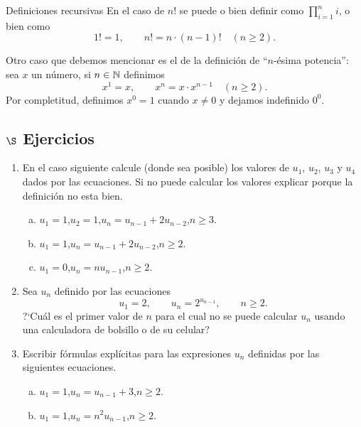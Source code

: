 \begin{section}{Definiciones recursivas}
En  el caso de $n!$ se puede  o bien definir como $\prod_{i=1}^{n} i$, o bien como
$$
1!=1,\qquad n!=n \cdot (n-1)! \quad (n\ge 2).
$$

Otro caso que debemos mencionar es  el de la definición de ``$n$-ésima potencia'': sea $x$ un  número, si $n \in {\mathbb N}$ definimos
$$
x^1=x,\qquad x^n= x \cdot x^{n-1} \quad (n\ge 2).
$$
Por completitud,  definimos $x^0=1$ cuando $x \ne 0$ y  dejamos indefinido $0^0$. 


\subsection*{\Large $\S$ Ejercicios}
\begin{enumerate}[1)]
\item En el caso siguiente calcule (donde sea posible) los
valores de $u_1$, $u_2$, $u_3$ y $u_4$ dados por las ecuaciones.
Si no puede calcular los valores explicar porque la definición no
esta bien.
\begin{enumerate}[a)]
\item $u_1 = 1$,\qquad $u_2=1$,\qquad $u_n = u_{n-1} +2 u_{n-2}$,\qquad $n \ge 3$. 
\item $u_1 = 1$,\qquad $u_n = u_{n-1} +2u_{n-2}$,\qquad $n \ge 2$. 
\item $u_1 = 0$,\qquad $u_n = nu_{n-1}$,\qquad $n \ge 2$.
\end{enumerate}
\item Sea $u_n$ definido por las ecuaciones
$$
u_1=2,\qquad u_n= 2^{u_{n-1}}, \qquad n\ge 2.
$$
?`Cuál es el primer valor de $n$ para el cual no se puede calcular
$u_n$ usando una calculadora de bolsillo o de su celular?
\item Escribir fórmulas explícitas para las expresiones $u_n$
definidas por las siguientes ecuaciones.
\begin{enumerate}[a)]
\item $u_1 = 1$,\qquad $u_n = u_{n-1} +3$,\qquad $n \ge 2$. 
\item $u_1 = 1$,\qquad $u_n = n^2u_{n-1}$,\qquad $n \ge 2$.
\end{enumerate}
\end{enumerate}
\end{section}


